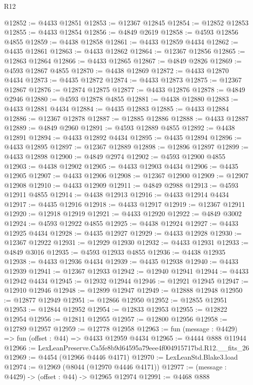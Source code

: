 \begin{lexlean}{R12}
\begin{coremodule}
@12852 := @4433 @12851
@12853 := @12367 @12845
@12854 := @12852 @12853
@12855 := @4433 @12854
@12856 := @4849 @2619
@12858 := @4593 @12856 @4855
@12859 := @4438 @12858
@12861 := @4433 @12859 @4434
@12862 := @4435 @12861
@12863 := @4433 @12862
@12864 := @12367 @12856
@12865 := @12863 @12864
@12866 := @4433 @12865
@12867 := @4849 @2826
@12869 := @4593 @12867 @4855
@12870 := @4438 @12869
@12872 := @4433 @12870 @4434
@12873 := @4435 @12872
@12874 := @4433 @12873
@12875 := @12367 @12867
@12876 := @12874 @12875
@12877 := @4433 @12876
@12878 := @4849 @2946
@12880 := @4593 @12878 @4855
@12881 := @4438 @12880
@12883 := @4433 @12881 @4434
@12884 := @4435 @12883
@12885 := @4433 @12884
@12886 := @12367 @12878
@12887 := @12885 @12886
@12888 := @4433 @12887
@12889 := @4849 @2960
@12891 := @4593 @12889 @4855
@12892 := @4438 @12891
@12894 := @4433 @12892 @4434
@12895 := @4435 @12894
@12896 := @4433 @12895
@12897 := @12367 @12889
@12898 := @12896 @12897
@12899 := @4433 @12898
@12900 := @4849 @2974
@12902 := @4593 @12900 @4855
@12903 := @4438 @12902
@12905 := @4433 @12903 @4434
@12906 := @4435 @12905
@12907 := @4433 @12906
@12908 := @12367 @12900
@12909 := @12907 @12908
@12910 := @4433 @12909
@12911 := @4849 @2988
@12913 := @4593 @12911 @4855
@12914 := @4438 @12913
@12916 := @4433 @12914 @4434
@12917 := @4435 @12916
@12918 := @4433 @12917
@12919 := @12367 @12911
@12920 := @12918 @12919
@12921 := @4433 @12920
@12922 := @4849 @3002
@12924 := @4593 @12922 @4855
@12925 := @4438 @12924
@12927 := @4433 @12925 @4434
@12928 := @4435 @12927
@12929 := @4433 @12928
@12930 := @12367 @12922
@12931 := @12929 @12930
@12932 := @4433 @12931
@12933 := @4849 @3016
@12935 := @4593 @12933 @4855
@12936 := @4438 @12935
@12938 := @4433 @12936 @4434
@12939 := @4435 @12938
@12940 := @4433 @12939
@12941 := @12367 @12933
@12942 := @12940 @12941
@12944 := @4433 @12942 @4434
@12945 := @12932 @12944
@12946 := @12921 @12945
@12947 := @12910 @12946
@12948 := @12899 @12947
@12949 := @12888 @12948
@12950 := @12877 @12949
@12951 := @12866 @12950
@12952 := @12855 @12951
@12953 := @12844 @12952
@12954 := @12833 @12953
@12955 := @12822 @12954
@12956 := @12811 @12955
@12957 := @12800 @12956
@12958 := @12789 @12957
@12959 := @12778 @12958
@12963 := fun (message : @4429) => fun (offset : @44) => @4433 @12959 @4434
@12965 := @4444 @888 @11944
@12966 := LexLeanPreserve.Ca5fe8b9d64595a79eee4f004915717bd.R12.__fits_26
@12969 := @4454 (@12966 @4446 @4171)
@12970 := LexLeanStd.Blake3.load
@12974 := @12969 (@8044 (@12970 @4446 @4171))
@12977 := (message : @4429) -> (offset : @44) -> @12965 @12974
@12991 := @4468
    @888

\end{coremodule}
\end{lexlean}
